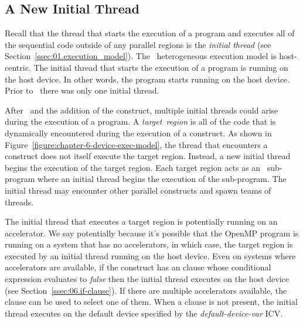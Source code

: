 \subsection{A New Initial Thread}
\label{ssec:06.initial-thread}

Recall that the thread that starts the execution of a program and executes all
of the sequential code outside of any parallel regions is the \emph{initial
thread} (see Section~\ref{ssec:01.execution_model}).  The \OMP\ heterogeneous
execution model is host-centric.  The initial thread that starts the execution
of a program is running on the host device.  In other words, the program starts
running on the host device.  Prior to \OMPfourzero\, there was only one initial thread.

\begin{figure*}[!tb]
\centering
{}
\caption{ \textbf{The heterogeneous programming model supported by OpenMP} -- \small
        Program execution begins on the host device.  When a host device
        thread encounters a \texttt{target} construct, a new initial thread 
        executes the target region.  When the initial thread encounters
        a \texttt{parallel} construct it becomes the master of a
        teams of threads.
        }
\label{figure:chapter-6-device-exec-model}
\end{figure*}

After \OMPfourzero\ and the addition of the  construct, multiple
initial threads could arise during the execution of a program.  A
\emph{target}~\emph{region} is all of the code that is dynamically encountered
during the execution of a  construct.  As shown in
Figure~\ref{figure:chapter-6-device-exec-model}, the thread that encounters a
 construct does not itself execute the target region.  Instead, a
new initial thread begins the execution of the target region.  Each
target region acts as an \OMP\ sub-program where an initial thread begins the
execution of the sub-program.  The initial thread may encounter
other parallel constructs and spawn teams of threads. 

The initial thread that executes a target region is potentially running on an
accelerator.  We say potentially because it's possible that the OpenMP
program is running on a system that has no accelerators, in which case, the
target region is executed by an initial thread running on the host device.
Even on systems where accelerators are available, if the 
construct has an  clause whose conditional expression evaluates to
\emph{false} then the initial thread executes on the host device (see
Section~\ref{ssec:06.if-clause}).  If there are multiple accelerators
available, the  clause %
can be used to select one of them.  When a  clause is not present,
the initial thread executes on the default device specified by the
\emph{default-device-var} ICV.


